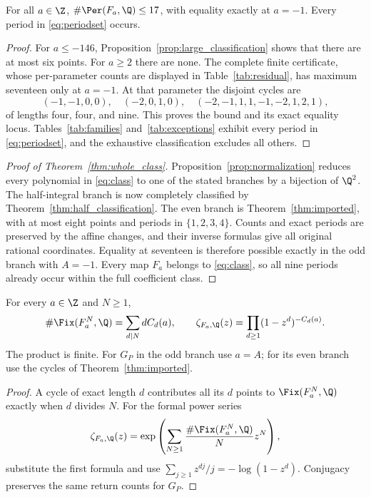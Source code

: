 \begin{proposition}
\label{prop:sharp}
For all $a\in\Z$, $\#\Per(F_a,\Q)\le17$, with equality
exactly at $a=-1$. Every period in \eqref{eq:periodset} occurs.
\end{proposition}
\begin{proof}
For $a\le-146$, Proposition~\ref{prop:large_classification}
shows that there are at most six points. For $a\ge2$ there
are none. The complete finite certificate, whose per-parameter
counts are displayed in Table~\ref{tab:residual}, has maximum
seventeen only at $a=-1$. At that parameter the disjoint cycles
are
\[
 (-1,-1,0,0),\quad (-2,0,1,0),\quad
 (-2,-1,1,1,-1,-2,1,2,1),
\]
of lengths four, four, and nine.
This proves the bound and its exact equality locus.
Tables~\ref{tab:families} and~\ref{tab:exceptions} exhibit
every period in \eqref{eq:periodset}, and the exhaustive
classification excludes all others.
\end{proof}

\begin{proof}[Proof of Theorem~\ref{thm:whole_class}]
Proposition~\ref{prop:normalization} reduces every polynomial
in \eqref{eq:class} to one of the stated branches by a bijection
of $\Q^2$. The half-integral branch is now completely classified
by Theorem~\ref{thm:half_classification}. The even branch is
Theorem~\ref{thm:imported}, with at most eight points and
periods in $\{1,2,3,4\}$. Counts and exact periods are preserved
by the affine changes, and their inverse formulas give all
original rational coordinates. Equality at seventeen is
therefore possible exactly in the odd branch with $A=-1$.
Every map $F_a$ belongs to \eqref{eq:class}, so all nine periods
already occur within the full coefficient class.
\end{proof}

\begin{corollary}
\label{cor:returns}
For every $a\in\Z$ and $N\ge1$,
\begin{equation}
 \#\Fix(F_a^N,\Q)=\sum_{d\mid N}dC_d(a),\qquad
 \zeta_{F_a,\Q}(z)=\prod_{d\ge1}(1-z^d)^{-C_d(a)}.
 \label{eq:returns}
\end{equation}
The product is finite. For $G_P$ in the odd branch use $a=A$;
for its even branch use the cycles of Theorem~\ref{thm:imported}.
\end{corollary}
\begin{proof}
A cycle of exact length $d$ contributes all its $d$ points to
$\Fix(F_a^N,\Q)$ exactly when $d$ divides $N$.
For the formal power series
\[
 \zeta_{F_a,\Q}(z)
 =\exp\left(\sum_{N\ge1}\frac{\#\Fix(F_a^N,\Q)}{N}z^N\right),
\]
substitute the first formula and use
$\sum_{j\ge1}z^{dj}/j=-\log(1-z^d)$.
Conjugacy preserves the same return counts for $G_P$.
\end{proof}
